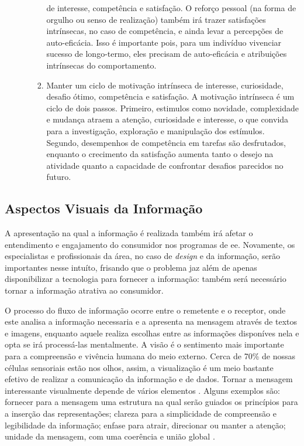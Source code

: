 \begin{itemize}
\begin{enumerate}
\begin{enumerate}
de interesse, competência e satisfação. O reforço pessoal (na forma de orgulho
ou senso de realização) também irá trazer satisfações intrínsecas, no caso de
competência, e ainda levar a percepções de auto-eficácia. Isso é
importante pois, para um indivíduo vivenciar sucesso de longo-termo, eles
precisam de auto-eficácia e atribuições intrínsecas do comportamento.
\item Manter um ciclo de motivação intrínseca de interesse, curiosidade, desafio
ótimo, competência e satisfação. A motivação intrínseca é um ciclo de dois
passos. Primeiro, estimulos como novidade, complexidade e mudança atraem a
atenção, curiosidade e interesse, o que convida para a investigação, exploração
e manipulação dos estímulos. Segundo, desempenhos de competência em tarefas são
desfrutados, enquanto o crecimento da satisfação aumenta tanto o desejo na
atividade quanto a capacidade de confrontar desafios parecidos no futuro. 
\end{enumerate}
\end{enumerate}
\end{itemize}

\subsection{Aspectos Visuais da Informação}
\label{ssec:asp_visuais}

A apresentação na qual a informação é realizada também irá afetar o entendimento
e engajamento do consumidor nos programas de \gls{ee}. Novamente, os especialistas
e profissionais da área, no caso de \emph{design} e da informação,
serão importantes nesse intuíto, frisando que o problema jaz além de
apenas disponibilizar a tecnologia para fornecer a informação: também
será necessário tornar a informação atrativa ao consumidor.

O processo do fluxo de informação ocorre entre o remetente e o
receptor, onde este analisa a informação necessaria e a apresenta na
mensagem através de textos e imagens, enquanto aquele realiza escolhas
entre as informações disponíves nela e opta se irá processá-las
mentalmente. A visão é o sentimento mais importante para a compreensão
e vivência humana do meio externo.  Cerca de 70\% de nossas células
sensoriais estão nos olhos, assim, a visualização é um meio bastante
efetivo de realizar a comunicação da informação e de dados.  Tornar a
mensagem interessante visualmente depende de vários elementos
\cite{2012_visualisation_sweden}. Alguns exemplos são: fornecer para a
mensagem uma estrutura na qual serão guiados os princípios para a
inserção das representações; clareza para a simplicidade de
compreensão e legibilidade da informação; enfase para atrair,
direcionar ou manter a atenção; unidade da mensagem, com uma coerência
e união global \cite{it_depends}.

